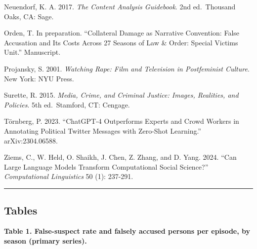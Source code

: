 \documentclass[
]{article}
\begin{document}
Neuendorf, K. A. 2017. \emph{The Content Analysis Guidebook}. 2nd
ed.~Thousand Oaks, CA: Sage.

Orden, T. In preparation. ``Collateral Damage as Narrative Convention:
False Accusation and Its Costs Across 27 Seasons of Law \& Order:
Special Victims Unit.'' Manuscript.

Projansky, S. 2001. \emph{Watching Rape: Film and Television in
Postfeminist Culture}. New York: NYU Press.

Surette, R. 2015. \emph{Media, Crime, and Criminal Justice: Images,
Realities, and Policies}. 5th ed.~Stamford, CT: Cengage.

Törnberg, P. 2023. ``ChatGPT-4 Outperforms Experts and Crowd Workers in
Annotating Political Twitter Messages with Zero-Shot Learning.''
arXiv:2304.06588.

Ziems, C., W. Held, O. Shaikh, J. Chen, Z. Zhang, and D. Yang. 2024.
``Can Large Language Models Transform Computational Social Science?''
\emph{Computational Linguistics} 50 (1): 237-291.

\begin{center}\rule{0.5\linewidth}{0.5pt}\end{center}

\subsection{Tables}\label{tables}

\textbf{Table 1. False-suspect rate and falsely accused persons per
episode, by season (primary series).}
\end{document}

